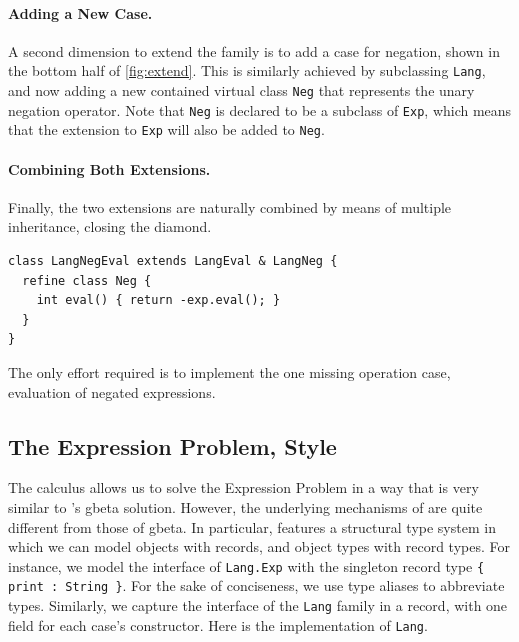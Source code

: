 \paragraph{Adding a New Case.}

A second dimension to extend the family is to add a case for negation, shown in
the bottom half of \cref{fig:extend}. This is similarly achieved by subclassing
\lstinline{Lang}, and now adding a new contained virtual class \lstinline{Neg}
that represents the unary negation operator. Note that \lstinline{Neg} is
declared to be a subclass of \lstinline{Exp}, which means that the extension to
\lstinline{Exp} will also be added to \lstinline{Neg}.


\paragraph{Combining Both Extensions.}

Finally, the two extensions are naturally combined by means of
multiple inheritance, closing the diamond.
\begin{lstlisting}[language=gbeta]
class LangNegEval extends LangEval & LangNeg {
  refine class Neg {
    int eval() { return -exp.eval(); }
  }
}
\end{lstlisting}
The only effort required is to implement the one missing operation
case, evaluation of negated expressions.


\subsection{The Expression Problem, \namee Style}

The \namee calculus allows us to solve the Expression Problem in a way that is
very similar to \citeauthor{Ernst_2001}'s gbeta solution. However, the underlying mechanisms of
\namee are quite different from those of gbeta. In particular, \namee features a
structural type system in which we can model objects with records, and object
types with record types. For instance, we model the interface of \lstinline{Lang.Exp}
with the singleton record type \lstinline${ print : String }$. For the sake of
conciseness, we use type aliases to abbreviate types.
Similarly, we capture the interface of the \lstinline{Lang} family in a record,
with one field for each case's constructor.
Here is the implementation of \lstinline{Lang}.

